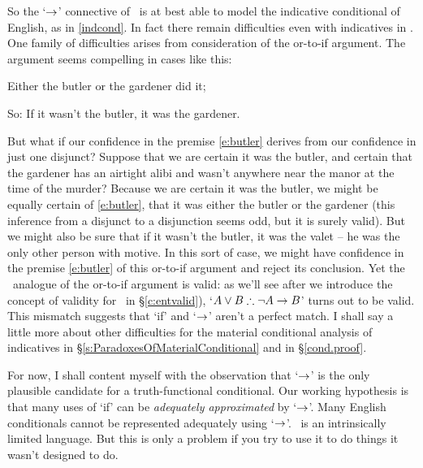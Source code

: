 So the `$\rightarrow$' connective of \TFL\ is at best able to model the indicative conditional of English, as in \ref{indcond}. In fact there remain difficulties even with indicatives in \TFL. One family of difficulties arises from consideration of the or-to-if argument. The argument seems compelling in cases like this:
\begin{earg}
	\item[\ex{e:butler}] Either the butler or the gardener did it;
	\item[So:] If it wasn't the butler, it was the gardener.
\end{earg} But what if our confidence in the premise \ref{e:butler} derives from our confidence in just one disjunct? Suppose that we are certain it was the butler, and certain that the gardener has an airtight alibi and wasn't anywhere near the manor at the time of the murder? Because we are certain it was the butler, we might be equally certain of \ref{e:butler}, that it was either the butler or the gardener (this inference from a disjunct to a disjunction seems odd, but it is surely valid). But we might also be sure that if it wasn't the butler, it was the valet – he was the only other person with motive. In this sort of case, we might have confidence in the premise \ref{e:butler} of this or-to-if argument and reject its conclusion. Yet the \TFL\ analogue of the or-to-if argument is valid: as we'll see after we introduce the concept of validity for \TFL\ in §\ref{c:entvalid}), `$A \vee B \mathrel{\therefore} \neg A \rightarrow B$' turns out to be valid. This mismatch suggests that `if' and `$\rightarrow$' aren't a perfect match. I shall say a little more about other difficulties for the material conditional analysis of indicatives in §\ref{s:ParadoxesOfMaterialConditional} and in §\ref{cond.proof}.

For now, I shall content myself with the observation that `$\rightarrow$' is the only plausible candidate for a truth-functional conditional. Our working hypothesis is that many uses of ‘if’ can be \emph{adequately approximated} by ‘$\rightarrow$’. Many English conditionals cannot be represented adequately using `$\rightarrow$'. \TFL\ is an intrinsically limited language. But this is only a problem if you try to use it to do things it wasn't designed to do. 



